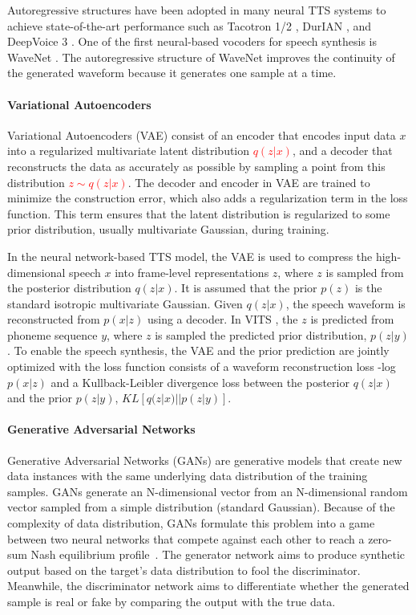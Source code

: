 Autoregressive structures have been adopted in many neural TTS systems to achieve state-of-the-art performance such as Tacotron 1/2 \cite{tacotron, tacotron2}, DurIAN \cite{durian}, and DeepVoice 3 \cite{deepvoice3}. One of the first neural-based vocoders for speech synthesis is WaveNet \cite{wavenet}. The autoregressive structure of WaveNet improves the continuity of the generated waveform because it generates one sample at a time.

\paragraph{Variational Autoencoders}

Variational Autoencoders (VAE) consist of an encoder that encodes input data $x$ into a regularized multivariate latent distribution \textcolor{red}{$q(z|x)$}, and a decoder that reconstructs the data as accurately as possible by sampling a point from this distribution \textcolor{red}{$z \sim q(z|x)$}. The decoder and encoder in VAE are trained to minimize the construction error, which also adds a regularization term in the loss function. This term ensures that the latent distribution is regularized to some prior distribution, usually multivariate Gaussian, during training.

In the neural network-based TTS model, the VAE is used to compress the high-dimensional speech $x$ into frame-level representations $z$, where $z$ is sampled from the posterior distribution $q(z|x)$. It is assumed that the prior $p(z)$ is the standard isotropic multivariate Gaussian. Given $q(z|x)$, the speech waveform is reconstructed from $p(x|z)$ using a decoder. In VITS \cite{vits, naturalspeech}, the $z$ is predicted from phoneme sequence $y$, where $z$ is sampled the predicted prior distribution, $p(z|y)$. To enable the speech synthesis, the VAE and the prior prediction are jointly optimized with the loss function consists of a waveform reconstruction loss -log $p(x|z)$ and a Kullback-Leibler divergence loss between the posterior $q(z|x)$ and the prior $p(z|y)$, $KL[q(z|x)||p(z|y)]$.


\paragraph{Generative Adversarial Networks}

Generative Adversarial Networks (GANs) are generative models that create new data instances with the same underlying data distribution of the training samples. GANs generate an N-dimensional vector from an N-dimensional random vector sampled from a simple distribution (standard Gaussian). Because of the complexity of data distribution, GANs formulate this problem into a game between two neural networks that compete against each other to reach a zero-sum Nash equilibrium profile~\cite{Goodfellow2014}. The generator network aims to produce synthetic output based on the target's data distribution to fool the discriminator. Meanwhile, the discriminator network aims to differentiate whether the generated sample is real or fake by comparing the output with the true data.

